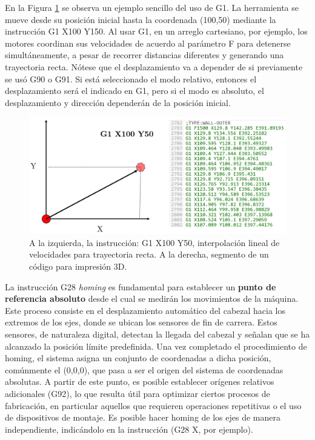 En la Figura \ref{g1} se observa un ejemplo sencillo del uso de G1. La herramienta se mueve desde su posición inicial hasta la coordenada (100,50) mediante la instrucción G1 X100 Y150. Al usar G1, en un arreglo cartesiano, por ejemplo, los motores coordinan sus velocidades de acuerdo al parámetro F para detenerse simultáneamente, a pesar de recorrer distancias diferentes y generando una trayectoria recta. Nótese que el desplazamiento va a depender de si previamente se usó G90 o G91. Si está seleccionado el modo relativo, entonces el desplazamiento será el indicado en G1, pero si el modo es absoluto, el desplazamiento y dirección dependerán de la posición inicial.


\begin{figure}[h!]
    \centering
    \includegraphics[width=0.8\linewidth]{imgs/g1.png}
    \caption{A la izquierda, la instrucción: G1 X100 Y50, interpolación lineal de velocidades para trayectoria recta. A la derecha, segmento de un código para impresión 3D.}
    \label{g1}
\end{figure}


La instrucción G28 \textit{homing} es fundamental para establecer un \textbf{punto de referencia absoluto} desde el cual se medirán los movimientos de la máquina. Este proceso consiste en el desplazamiento automático del cabezal hacia los extremos de los ejes, donde se ubican los sensores de fin de carrera. Estos sensores, de naturaleza digital, detectan la llegada del cabezal y señalan que se ha alcanzado la posición límite predefinida. Una vez completado el procedimiento de homing, el sistema asigna un conjunto de coordenadas a dicha posición, comúnmente el (0,0,0), que pasa a ser el origen del sistema de coordenadas absolutas. A partir de este punto, es posible establecer orígenes relativos adicionales (G92), lo que resulta útil para optimizar ciertos procesos de fabricación, en particular aquellos que requieren operaciones repetitivas o el uso de dispositivos de montaje. Es posible hacer homing de los ejes de manera independiente, indicándolo en la instrucción (G28 X, por ejemplo).

